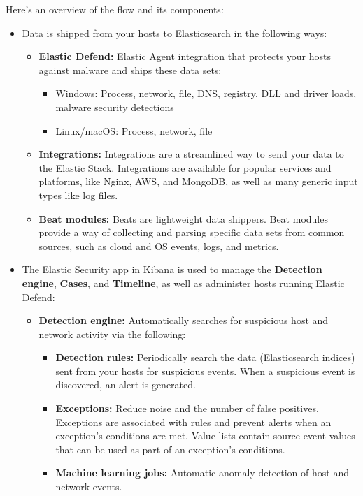 \documentclass{report}
\begin{document}
Here's an overview of the flow and its components:

\begin{itemize}
	\item Data is shipped from your hosts to Elasticsearch in the following ways:
	\begin{itemize}
		\item \textbf{Elastic Defend:} Elastic Agent integration that protects your hosts against malware and ships these data sets:
		\begin{itemize}
			\item Windows: Process, network, file, DNS, registry, DLL and driver loads, malware security detections
			\item Linux/macOS: Process, network, file
		\end{itemize}
		\item \textbf{Integrations:} Integrations are a streamlined way to send your data to the Elastic Stack. 
		Integrations are available for popular services and platforms, like Nginx, AWS, and MongoDB, 
		as well as many generic input types like log files.
		\item \textbf{Beat modules:} Beats are lightweight data shippers. 
		Beat modules provide a way of collecting and parsing specific data sets from common sources, such as cloud and OS events, logs, and metrics.
	\end{itemize}
	\item The Elastic Security app in Kibana is used to manage the \textbf{Detection engine}, \textbf{Cases}, and \textbf{Timeline}, 
	as well as administer hosts running Elastic Defend:
	\begin{itemize}
		\item \textbf{Detection engine:} Automatically searches for suspicious host and network activity via the following:
		\begin{itemize}
			\item \textbf{Detection rules:} Periodically search the data (Elasticsearch indices) sent from your hosts for 
			suspicious events. 
			When a suspicious event is discovered, an alert is generated.
			\item \textbf{Exceptions:} Reduce noise and the number of false positives. 
			Exceptions are associated with rules and prevent alerts when an exception's conditions are met. 
			Value lists contain source event values that can be used as part of an exception's conditions. 
			\item \textbf{Machine learning jobs:} Automatic anomaly detection of host and network events.

\end{itemize}
\end{itemize}
\end{itemize}
\end{document}
